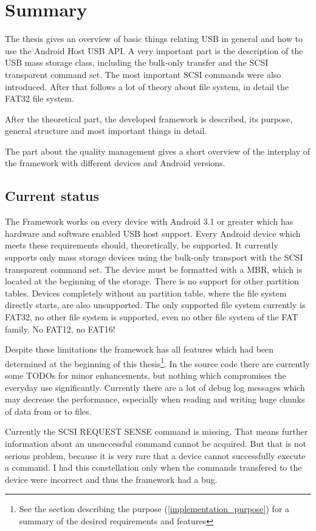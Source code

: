 \chapter{Summary}

The thesis gives an overview of basic things relating USB in general and how to use the Android Host USB API. A very important part is the description of the USB mass storage class, including the bulk-only transfer and the SCSI transparent command set. The most important SCSI commands were also introduced. After that follows a lot of theory about file system, in detail the FAT32 file system.

After the theoretical part, the developed framework is described, its purpose, general structure and most important things in detail.

The part about the quality management gives a short overview of the interplay of the framework with different devices and Android versions.

\section{Current status}

The Framework works on every device with Android 3.1 or greater which has hardware and software enabled USB host support. Every Android device which meets these requirements should, theoretically, be supported. It currently supports only mass storage devices using the bulk-only transport with the SCSI transparent command set. The device must be formatted with a MBR, which is located at the beginning of the storage. There is no support for other partition tables. Devices completely without an partition table, where the file system directly starts, are also unsupported. The only supported file system currently is FAT32, no other file system is supported, even no other file system of the FAT family. No FAT12, no FAT16!

Despite these limitations the framework has all features which had been determined at the beginning of this thesis\footnote{See the section describing the purpose (\ref{implementation_purpose}) for a summary of the desired requirements and features}. In the source code there are currently some TODOs for minor enhancements, but nothing which compromises the everyday use significantly. Currently there are a lot of debug log messages which may decrease the performance, especially when reading and writing huge chunks of data from or to files.

Currently the SCSI REQUEST SENSE command is missing. That means further information about an unsuccessful command cannot be acquired. But that is not serious problem, because it is very rare that a device cannot successfully execute a command. I had this constellation only when the commands transfered to the device were incorrect and thus the framework had a bug.

